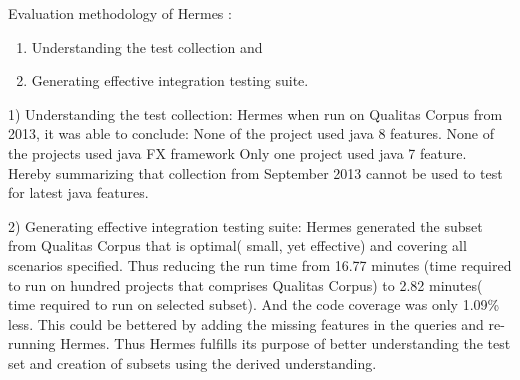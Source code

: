 \documentclass[authoryear,preprint]{sigplanconf}
\begin{document}
\begin{table*}[h]
	\centering
	\captionsetup{justification=centering}
	\caption{Which characteristics each of the approaches has}
	\label{my-label}
\end{table*}

Evaluation methodology of Hermes : 
\begin{enumerate}
	\item Understanding the test collection and 
	\item Generating effective integration testing suite.
\end{enumerate}

1) Understanding the test collection:
Hermes when run on Qualitas Corpus from 2013, it was able to conclude: None of the project used java 8 features. None of the projects used java FX framework Only one project used java 7 feature. Hereby summarizing that collection from September 2013 cannot be used to test for latest java features.

2) Generating effective integration testing suite:
Hermes generated the subset from Qualitas Corpus that is optimal( small, yet effective) and covering all scenarios specified. Thus reducing the run time from 16.77 minutes (time required to run on hundred projects that comprises Qualitas Corpus) to 2.82 minutes( time required to run on selected subset). And the code coverage was only 1.09\% less. This could be bettered by adding the missing features in the queries and re-running Hermes. Thus Hermes fulfills its purpose of better understanding the test set and creation of subsets using the derived understanding.
\end{document}
